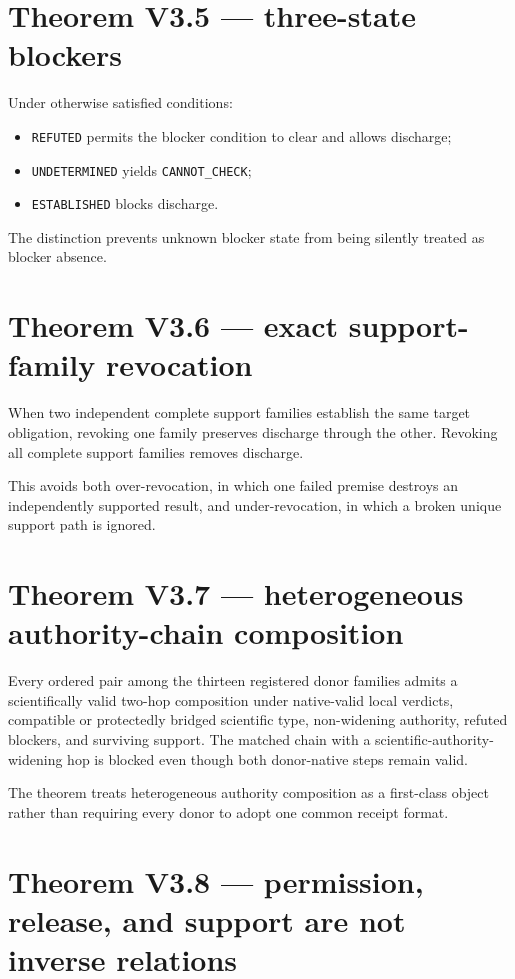 \section{Theorem V3.5 --- three-state blockers}

Under otherwise satisfied conditions:

\begin{itemize}
  \item \texttt{REFUTED} permits the blocker condition to clear and allows discharge;
  \item \texttt{UNDETERMINED} yields \texttt{CANNOT_CHECK};
  \item \texttt{ESTABLISHED} blocks discharge.
\end{itemize}

The distinction prevents unknown blocker state from being silently treated as blocker absence.

\section{Theorem V3.6 --- exact support-family revocation}

When two independent complete support families establish the same target obligation, revoking one family preserves discharge through the other. Revoking all complete support families removes discharge.

This avoids both over-revocation, in which one failed premise destroys an independently supported result, and under-revocation, in which a broken unique support path is ignored.

\section{Theorem V3.7 --- heterogeneous authority-chain composition}

Every ordered pair among the thirteen registered donor families admits a scientifically valid two-hop composition under native-valid local verdicts, compatible or protectedly bridged scientific type, non-widening authority, refuted blockers, and surviving support. The matched chain with a scientific-authority-widening hop is blocked even though both donor-native steps remain valid.

The theorem treats heterogeneous authority composition as a first-class object rather than requiring every donor to adopt one common receipt format.

\section{Theorem V3.8 --- permission, release, and support are not inverse relations}

